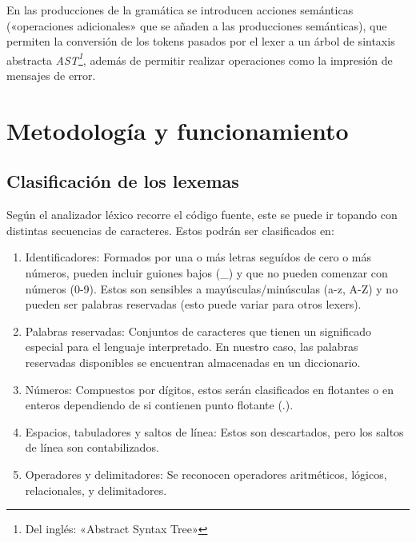 \documentclass[a4paper,twocolumn]{article}
\begin{document}
    En las producciones de la gramática se introducen acciones semánticas («operaciones adicionales» que se añaden a las producciones semánticas), que permiten la conversión de los tokens pasados por el lexer a un árbol de sintaxis abstracta \textit{AST\footnote{Del inglés: «Abstract Syntax Tree»}}, además de permitir realizar operaciones como la impresión de mensajes de error.


    \section{Metodología y funcionamiento}\label{sec:metodologia-y-funcionamiento}

    \subsection{Clasificación de los lexemas}\label{subsec:clasificacion-de-los-lexemas}
    Según el analizador léxico recorre el código fuente, este se puede ir topando con distintas secuencias de caracteres.
    Estos podrán ser clasificados en:
    \begin{enumerate}
        \item{Identificadores:} Formados por una o más letras seguídos de cero o más números, pueden incluir guiones bajos (\_) y que no pueden comenzar con números (0-9).
        Estos son sensibles a mayúsculas/minúsculas (a-z, A-Z) y no pueden ser palabras reservadas (esto puede variar para otros lexers).

        \item{Palabras reservadas:} Conjuntos de caracteres que tienen un significado especial para el lenguaje interpretado.
        En nuestro caso, las palabras reservadas disponibles se encuentran almacenadas en un diccionario.

        \item{Números:}
        Compuestos por dígitos, estos serán clasificados en flotantes o en enteros dependiendo de si contienen punto flotante (.).

        \item{Espacios, tabuladores y saltos de línea:}
        Estos son descartados, pero los saltos de línea son contabilizados.

        \item{Operadores y delimitadores:}
        Se reconocen operadores aritméticos, lógicos, relacionales, y delimitadores.

    \end{enumerate}
\end{document}

